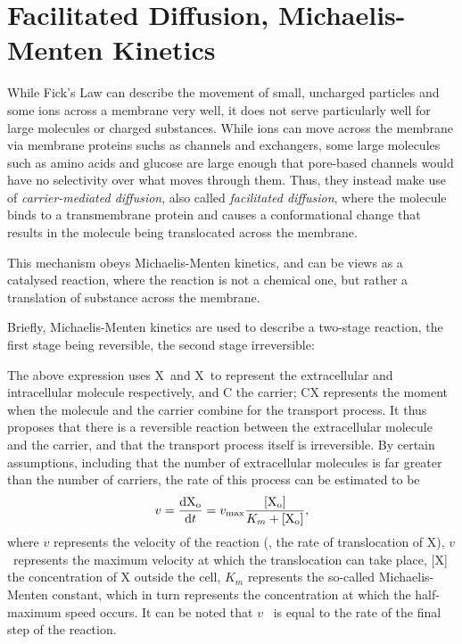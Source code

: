 \documentclass[../thesis-main.tex]{subfiles}
\begin{document}
 \section{Facilitated Diffusion, Michaelis-Menten Kinetics}
 \label{sec:facil-diff}
 While Fick's Law can describe the movement of small, uncharged particles and some ions across a membrane very well, it does not serve particularly well for large molecules or charged substances. While ions can move across the membrane via membrane proteins suchs as channels and exchangers, some large molecules such as amino acids and glucose are large enough that pore-based channels would have no selectivity over what moves through them. Thus, they instead make use of \emph{carrier-mediated diffusion}, also called \emph{facilitated diffusion}, where the molecule binds to a transmembrane protein and causes a conformational change that results in the molecule being translocated across the membrane.
 
 This mechanism obeys Michaelis-Menten kinetics, and can be views as a catalysed reaction, where the reaction is not a chemical one, but rather a translation of substance across the membrane.
 
 Briefly, Michaelis-Menten kinetics are used to describe a two-stage reaction, the first stage being reversible, the second stage irreversible:
 \begin{center}
 \end{center}
 The above expression uses X~and X~to represent the extracellular and intracellular molecule respectively, and C the carrier; CX represents the moment when the molecule and the carrier combine for the transport process. It thus proposes that there is a reversible reaction between the extracellular molecule and the carrier, and that the transport process itself is irreversible. By certain assumptions, including that the number of extracellular molecules is far greater than the number of carriers, the rate of this process can be estimated to be
 \begin{equation}
  v = \frac{\textnormal{dX}_\textnormal{o}}{\textnormal{d}t} = v_\textnormal{max}\frac{[\textnormal{X}_\textnormal{o}]}{K_m + [\textnormal{X}_\textnormal{o}]},
 \end{equation}
 where $v$ represents the velocity of the reaction (\idest, the rate of translocation of X), $v$~represents the maximum velocity at which the translocation can take place, [X] the concentration of X outside the cell, $K_m$ represents the so-called Michaelis-Menten constant, which in turn represents the concentration at which the half-maximum speed occurs. It can be noted that $v$~ is equal to the rate of the final step of the reaction.
 
\end{document}
